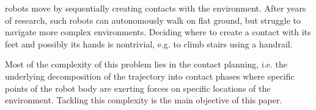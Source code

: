 \newcommand{\Pa}{$\mathcal{P}_1$ }
\newcommand{\Pb}{$\mathcal{P}_2$ }

 robots move by sequentially creating contacts with the environment.
After years of research, such robots can autonomously walk on flat ground, but struggle to navigate more complex environments.
Deciding
where
to
create a 
contact with its feet and
possibly
its
hands
is
nontrivial,
e.g. to climb stairs using a
handrail.

Most of the complexity of this problem lies in the contact planning, i.e. the underlying decomposition
of the trajectory into contact phases where specific points
of
the
robot body are exerting forces on specific locations
of
the
environment. Tackling this complexity is the main
objective
of this paper.

